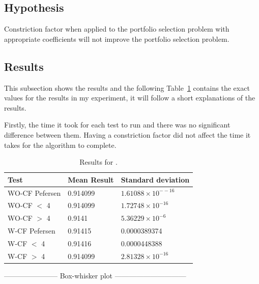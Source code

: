 \documentclass{pdfmx4020}
\begin{document}
    \subsection{Hypothesis} %
    \label{sub:hypothesis}
      Constriction factor when applied to the portfolio selection problem with appropriate coefficients will not improve the portfolio selection problem.

    \subsection{Results} %
    \label{sub:results}
      This subsection shows the results and the following Table~\ref{table:constriction_factor_results} contains the exact values for the results in my experiment, it will follow a short explanations of the results. 

      Firstly, the time it took for each test to run and there was no significant difference between them. Having a constriction factor did not affect the time it takes for the algorithm to complete. 

        \begin{table}[H]
          \setlength{\extrarowheight}{2.0pt}
          \begin{tabular}{|l|l|l|}
            \hline
            Test & Mean Result & Standard deviation \\
            \hline
            WO-CF Pefersen & 0.914099 & $1.61088\times10^{--16}$ \\
            \hline
            WO-CF $<$ 4 & 0.914099 & $1.72748\times10^{-16}$ \\
            \hline
            WO-CF $>$ 4 & 0.9141 & $5.36229\times10^{-6}$ \\
            \hline
            W-CF Pefersen & 0.91415 & 0.0000389374 \\
            \hline
            W-CF $<$ 4 & 0.91416 & 0.0000448388 \\
            \hline
            W-CF $>$ 4 & 0.914099 & $2.81328\times10^{-16}$ \\
            \hline
          \end{tabular}
          \caption{Results for .}
          \label{table:constriction_factor_results}
        \end{table}

      ----------------------- Box-whisker plot ------------------------------
\end{document}
